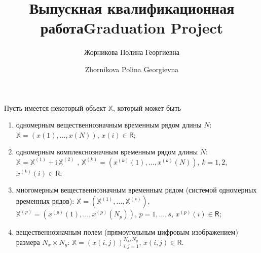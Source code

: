 \documentclass[specialist,
               substylefile = spbu.rtx,
               subf,href,colorlinks=true, 12pt]{disser}
\newcommand{\I}{\mathrm{i}}
\begin{document}
%
%


\title{Выпускная квалификационная работа}


\author{Жорникова Полина Георгиевна}



\date{\number\year}

\maketitle

%
%
\title{Graduation Project}
%
%
\author{Zhornikova Polina Georgievna} %
%
%
%
\date{\number\year}
%
\maketitle[en]

\tableofcontents

\intro
Пусть имеется некоторый объект $\mathbb{X}$, который может быть
\begin{enumerate}
\item одномерным вещественнозначным временным рядом длины $N$: $\mathbb{X}= (x(1),\ldots,x(N))$, $x(i) \in \mathsf{R}$;
\item одномерным комплекснозначным временным рядом длины $N$: $\mathbb{X}=\mathbb{X}^{(1)} + \I \,\mathbb{X}^{(2)}$ , $\mathbb{X}^{(k)}= \left(x^{(k)}(1),\ldots,x^{(k)}(N)\right)$, $k=1,2$, $x^{(k)}(i) \in \mathsf{R}$;
\item многомерным вещественнозначным временным рядом (системой одномерных временных рядов): $\mathbb{X}= \left(\mathbb{X}^{(1)}, \ldots,\mathbb{X}^{(s)}\right)$, $\mathbb{X}^{(p)}= \left(x^{(p)}(1),\ldots,x^{(p)}(N_p)\right)$, $p=1,\ldots,s$, $x^{(p)}(i) \in \mathsf{R}$;
\item вещественнозначным полем (прямоугольным цифровым изображением) размера $N_x \times N_y$: $\mathbb{X}= \left(x(i,j) \right)_{i,j=1}^{N_x,N_y}$, $x(i,j) \in \mathsf{R}$.
\end{enumerate}
\end{document}
